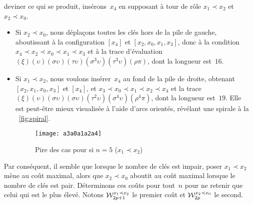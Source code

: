 deviner ce qui se produit, insérons~\(x_4\) en supposant à tour de
rôle \(x_1 \prec x_2\) et \(x_2 \prec x_0\).
\begin{itemize}

\item Si \(x_2 \prec x_0\), nous déplaçons toutes les clés hors de la
  pile de gauche, aboutissant à la configuration \([x_4]\) et \([x_2,
  x_0, x_1, x_3]\), donc à la condition \(x_4 \prec x_2 \prec x_0
  \prec x_1 \prec x_3\) et à la trace d'évaluation
  \((\xi)(\upsilon)(\sigma\upsilon)(\tau\upsilon)(\sigma^3\upsilon)
  (\tau^3\upsilon)(\rho\pi)\), dont la longueur est~\(16\).

\item Si \(x_1 \prec x_2\), nous voulons insérer~\(x_4\) au fond de la
  pile de droite, obtenant \([x_2, x_1, x_0, x_3]\) et \([x_4]\), et
  \(x_3 \prec x_0 \prec x_1 \prec x_2 \prec x_4\) et la trace
  \((\xi)(\upsilon)
  (\sigma\upsilon)(\sigma\upsilon)(\tau^2\upsilon)(\sigma^4\upsilon)
  (\rho^4\pi)\), dont la longueur est~\(19\). Elle est peut-être mieux
  visualisée à l'aide d'arcs orientés, révélant une spirale à la
  \fig~\vref{fig:spiral}.
  \begin{figure}
    \centering
    \texttt{[image: a3a0a1a2a4]}
    \caption{Pire des cas pour  si \(n=5\) (\(x_1 \prec x_2\))}
    \label{fig:spiral}
  \end{figure}

\end{itemize}
Par conséquent, il semble que lorsque le nombre de clés est impair,
poser \(x_1 \prec x_2\) mène au coût maximal, alors que \(x_2 \prec
x_0\) aboutit au coût maximal lorsque le nombre de clés est
pair. Déterminons ces coûts pour tout~\(n\) pour ne retenir que celui
qui est le plus élevé. Notons \(\W{x_1 \prec x_2}{2p+1}\) le premier
coût et \(\W{x_2 \prec x_0}{2p}\) le second.
